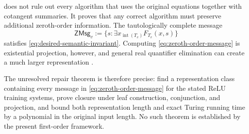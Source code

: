  does not rule out every algorithm that uses the
original equations together with cotangent summaries.  It proves that any
correct algorithm must preserve additional zeroth-order information.  The
tautologically complete message
\begin{equation}
  \mathsf{ZMsg}_v
  :=\{s:\exists x_{\operatorname{int}(T_v)}F_{T_v}(x,s)\}
  \label{eq:zeroth-order-message}
\end{equation}
satisfies \cref{eq:desired-semantic-invariant}.  Computing
\cref{eq:zeroth-order-message} is existential projection, however, and general
real quantifier elimination can create a much larger representation
\cite{Collins1975,Renegar1992I,BasuPollackRoy2006}.

The unresolved repair theorem is therefore precise: find a representation
class containing every message in \cref{eq:zeroth-order-message} for the stated
ReLU training systems, prove closure under leaf construction, conjunction, and
projection, and bound both representation length and exact Turing running time
by a polynomial in the original input length.  No such theorem is established
by the present first-order framework.
